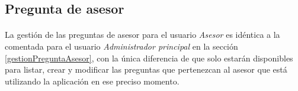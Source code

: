 \subsection{Pregunta de asesor}

  \paragraph{}La gestión de las preguntas de asesor para el usuario
  \textit{Asesor} es idéntica a la comentada para el usuario
  \textit{Administrador principal} en la sección \ref{gestionPreguntaAsesor},
  con la única diferencia de que solo estarán disponibles para listar, crear y
  modificar las preguntas que pertenezcan al asesor que está utilizando la
  aplicación en ese preciso momento.